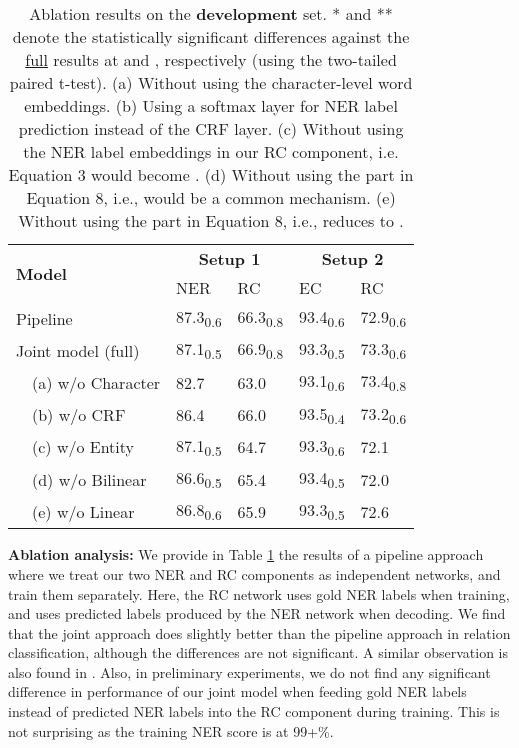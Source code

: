 \documentclass[runningheads]{llncs}
\begin{document}
 \begin{table}[!t]
\centering
\caption{Ablation results on the \textbf{development} set.  * and ** denote the statistically significant differences against the  \underline{full} results at  and , respectively (using the  two-tailed paired t-test). (a) Without using the character-level word embeddings. (b) Using a softmax layer for NER label prediction instead of the CRF layer. (c)  Without using the NER label embeddings in our RC component, i.e. Equation 3 would become . (d)  Without using the  part in Equation 8, i.e.,  would be a common  mechanism.  (e)  Without using the  part in Equation 8, i.e.,  reduces to .}
\setlength{\tabcolsep}{0.5em}
\begin{tabular}{l|ll|ll}
\hline
\multirow{2}{*}{\bf Model} & \multicolumn{2}{c|}{\bf Setup 1} & \multicolumn{2}{c}{\bf Setup 2}\\
\cline{2-5}
& NER & RC & EC & RC \\
\hline
Pipeline & 87.3\textsubscript{0.6}	 & 66.3\textsubscript{0.8} & 93.4\textsubscript{0.6}	& 72.9\textsubscript{0.6} \\
\hline
Joint model (full) & 87.1\textsubscript{0.5}	& 66.9\textsubscript{0.8} & 93.3\textsubscript{0.5}	& 73.3\textsubscript{0.6}	 \\
\hdashline
\ \ (a) w/o Character & 82.7	& 63.0	& 93.1\textsubscript{0.6}	& 73.4\textsubscript{0.8}	  \\
\ \ (b)  w/o CRF &  86.4	 &  	66.0 & 93.5\textsubscript{0.4}	& 73.2\textsubscript{0.6}	 \\ 
\ \ (c)  w/o Entity & 87.1\textsubscript{0.5} & 64.7	& 93.3\textsubscript{0.6} 	& 72.1  \\
\ \ (d)  w/o Bilinear 	&  86.6\textsubscript{0.5} 	& 65.4 & 93.4\textsubscript{0.5} 	& 72.0  \\
\ \ (e)  w/o Linear	& 86.8\textsubscript{0.6} 	& 65.9 & 93.3\textsubscript{0.5} 	& 72.6 \\
\hline
\end{tabular}
\label{tab:ablation}
\end{table}

\medskip

\noindent \textbf{Ablation analysis:} 
We  provide in Table  \ref{tab:ablation} the results of a pipeline approach where we treat our two NER and RC  components  as independent networks, and  train them separately.  Here, the  RC network uses gold NER labels when training, and uses predicted labels produced by the NER network when decoding.  We find that the   joint approach does slightly better   than the pipeline approach in relation classification,  although the differences  are not significant. A similar observation is also found in \cite{miwa-bansal:2016:P16-1}. Also, in preliminary experiments, we  do not find any significant difference  in performance of our joint  model when feeding gold NER labels instead of predicted NER labels into the RC component during training. This is not surprising as the training NER score is at 99+\%. 
\end{document}
